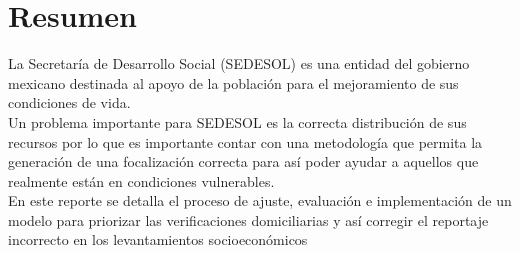 \section*{Resumen}
La Secretaría de Desarrollo Social (SEDESOL) es una entidad del gobierno mexicano destinada al apoyo de la población para el mejoramiento de sus condiciones de vida.\\
Un problema importante para SEDESOL es la correcta distribución de sus recursos por lo que es importante contar con una metodología que permita la generación de una focalización correcta para así poder ayudar a aquellos que realmente están en condiciones vulnerables.\\
En este reporte se detalla el proceso de ajuste, evaluación e implementación de un modelo para priorizar las verificaciones domiciliarias y así corregir el reportaje incorrecto en los levantamientos socioeconómicos
\clearpage

